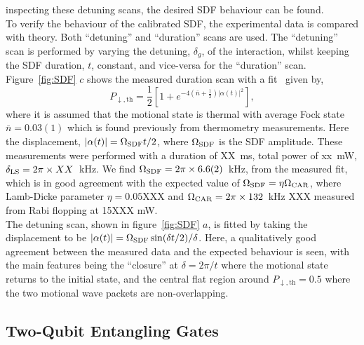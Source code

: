     inspecting these detuning scans, the desired SDF behaviour can be found. \\
    To verify the behaviour of the calibrated SDF, the experimental data is compared with theory. Both
    ``detuning'' and ``duration'' scans are used. The ``detuning'' scan is performed by
    varying the detuning, $\delta_g$, of the interaction, whilst keeping the
    SDF duration, $t$, constant, and vice-versa for the ``duration'' scan. \\
    Figure~\ref{fig:SDF} $c$ shows the measured duration scan with a fit~\cite{} given by,
    \begin{equation}
        P_{\downarrow,\mathrm{th}} = \frac{1}{2} \left[ 1 + e^{-4\left( \bar{n} + \frac{1}{2} \right) |\alpha(t)|^2} \right],
    \end{equation}
    where it is assumed that the motional state is thermal with average Fock state $\bar{n}
    = 0.03(1)$ which is found previously from thermometry measurements. Here the
    displacement, $|\alpha(t)| = \Omega_{\rm SDF} t/2$, where $\Omega_{\rm SDF}$ is the
    SDF amplitude. 
    These measurements were performed with a duration of XX~ms, total power of xx~mW, $\delta_{\rm LS}=2\pi\times XX$~kHz.
    We find $\Omega_{\rm SDF} = 2\pi\times 6.6(2)$~kHz, from the
    measured fit, which is in good agreement with the expected value of
    $\Omega_{\rm SDF} = \eta\Omega_{\rm CAR}$, where Lamb-Dicke parameter $\eta =
    0.05$XXX and $\Omega_{\rm CAR} = 2\pi \times 132$~kHz XXX measured from Rabi
    flopping at 15XXX mW.\\
    The detuning scan, shown in figure~\ref{fig:SDF} $a$, is fitted by taking the
    displacement to be $|\alpha(t)| = \Omega_{\rm SDF} \sin(\delta t/2)/\delta$. Here,
    a qualitatively good agreement between the measured data and the
    expected behaviour is seen, with the main features being the ``closure''
    at $\delta = 2\pi/t$ where the motional state returns to the initial state,
    and the central flat region around $P_{\downarrow, \mathrm{th}} =0.5$ where
    the two motional wave packets are non-overlapping.\\


\subsection{Two-Qubit Entangling Gates}
\label{sec:Two-Qubit Entangling Gates}

